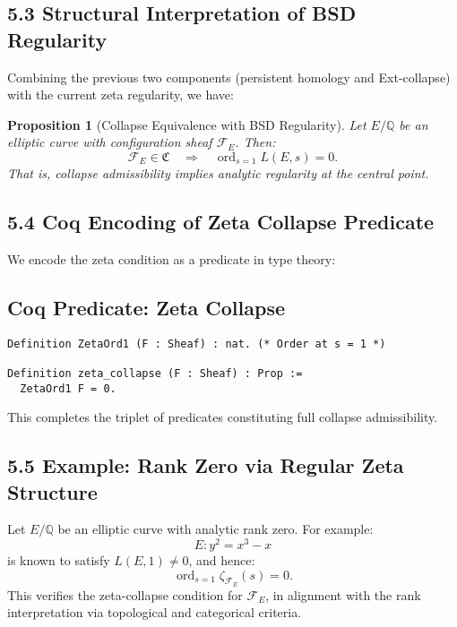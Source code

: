\documentclass[11pt]{article}
\newtheorem{proposition}[theorem]{Proposition}
\newcommand{\ord}{\operatorname{ord}}
\begin{document}
\subsection*{5.3 Structural Interpretation of BSD Regularity}

Combining the previous two components (persistent homology and Ext-collapse) with the current zeta regularity, we have:

\begin{proposition}[Collapse Equivalence with BSD Regularity]
\label{prop:zeta-collapse-rank}
Let \( E/\mathbb{Q} \) be an elliptic curve with configuration sheaf \( \mathcal{F}_E \). Then:
\[
\mathcal{F}_E \in \mathfrak{C} \quad \Longrightarrow \quad \ord_{s=1} L(E,s) = 0.
\]
That is, collapse admissibility implies analytic regularity at the central point.
\end{proposition}

\subsection*{5.4 Coq Encoding of Zeta Collapse Predicate}

We encode the zeta condition as a predicate in type theory:

\subsection*{Coq Predicate: Zeta Collapse}
\begin{lstlisting}[language=Coq]
Definition ZetaOrd1 (F : Sheaf) : nat. (* Order at s = 1 *)

Definition zeta_collapse (F : Sheaf) : Prop :=
  ZetaOrd1 F = 0.
\end{lstlisting}

This completes the triplet of predicates constituting full collapse admissibility.

\subsection*{5.5 Example: Rank Zero via Regular Zeta Structure}

Let \( E/\mathbb{Q} \) be an elliptic curve with analytic rank zero. For example:
\[
E: y^2 = x^3 - x
\]
is known to satisfy \( L(E,1) \neq 0 \), and hence:
\[
\ord_{s=1} \zeta_{\mathcal{F}_E}(s) = 0.
\]
This verifies the zeta-collapse condition for \( \mathcal{F}_E \), in alignment with the rank interpretation via topological and categorical criteria.
\end{document}

